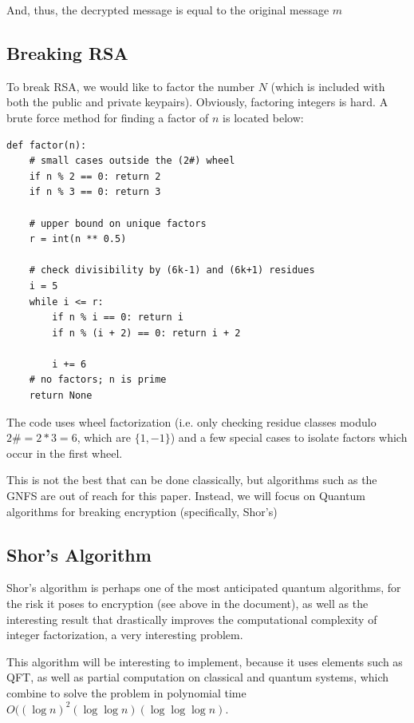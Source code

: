 \documentclass[a4paper,11pt]{article}
\theoremstyle{mytheor}
\begin{document}
And, thus, the decrypted message is equal to the original message $m$

\subsection{Breaking RSA}

To break RSA, we would like to factor the number $N$ (which is included with both the public and private keypairs). Obviously, factoring integers is hard. A brute force method for finding a factor of $n$ is located below:

\begin{lstlisting}
def factor(n):
    # small cases outside the (2#) wheel
    if n % 2 == 0: return 2
    if n % 3 == 0: return 3
    
    # upper bound on unique factors
    r = int(n ** 0.5)
    
    # check divisibility by (6k-1) and (6k+1) residues
    i = 5
    while i <= r:
        if n % i == 0: return i
        if n % (i + 2) == 0: return i + 2
        
        i += 6
    # no factors; n is prime
    return None
\end{lstlisting}


The code uses wheel factorization (i.e. only checking residue classes modulo $2\#=2*3=6$, which are $\{1, -1\}$) and a few special cases to isolate factors which occur in the first wheel.

This is not the best that can be done classically, but algorithms such as the GNFS are out of reach for this paper. Instead, we will focus on Quantum algorithms for breaking encryption (specifically, Shor's)

\subsection{Shor's Algorithm}\label{sec:shor}

Shor's algorithm is perhaps one of the most anticipated quantum algorithms, for the risk it poses to encryption (see above in the document), as well as the interesting result that drastically improves the computational complexity of integer factorization, a very interesting problem.

This algorithm will be interesting to implement, because it uses elements such as QFT, as well as partial computation on classical and quantum systems, which combine to solve the problem in polynomial time $O((\log n)^2(\log \log n)(\log \log \log n)$.
\end{document}
